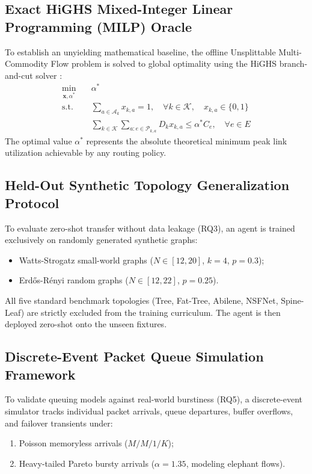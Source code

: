 \documentclass[12pt,a4paper,oneside]{report}
\begin{document}
\subsection{Exact HiGHS Mixed-Integer Linear Programming (MILP) Oracle}
To establish an unyielding mathematical baseline, the offline Unsplittable Multi-Commodity Flow problem is solved to global optimality using the HiGHS branch-and-cut solver \cite{huangfu2018parallelizing}:
\begin{align}
\min_{\mathbf{x}, \alpha^*} \quad & \alpha^* \\
\text{s.t.} \quad & \sum_{a \in \mathcal{A}_k} x_{k, a} = 1, \quad \forall k \in \mathcal{K}, \quad x_{k, a} \in \{0, 1\} \\
& \sum_{k \in \mathcal{K}} \sum_{a: e \in \mathcal{P}_{k, a}} D_k x_{k, a} \le \alpha^* C_e, \quad \forall e \in E
\end{align}
The optimal value $\alpha^*$ represents the absolute theoretical minimum peak link utilization achievable by any routing policy.

\subsection{Held-Out Synthetic Topology Generalization Protocol}
To evaluate zero-shot transfer without data leakage (RQ3), an agent is trained exclusively on randomly generated synthetic graphs:
\begin{itemize}
  \item Watts-Strogatz small-world graphs ($N \in [12, 20]$, $k=4$, $p=0.3$);
  \item Erd\H{o}s-R\'enyi random graphs ($N \in [12, 22]$, $p=0.25$).
\end{itemize}
All five standard benchmark topologies (Tree, Fat-Tree, Abilene, NSFNet, Spine-Leaf) are strictly excluded from the training curriculum. The agent is then deployed zero-shot onto the unseen fixtures.

\subsection{Discrete-Event Packet Queue Simulation Framework}
To validate queuing models against real-world burstiness (RQ5), a discrete-event simulator tracks individual packet arrivals, queue departures, buffer overflows, and failover transients under:
\begin{enumerate}
  \item Poisson memoryless arrivals ($M/M/1/K$);
  \item Heavy-tailed Pareto bursty arrivals ($\alpha = 1.35$, modeling elephant flows).
\end{enumerate}
\end{document}
